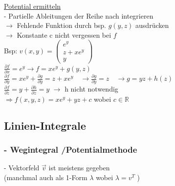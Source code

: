 \documentclass[6pt]{article}
\begin{document}
\begin{multicols*}{3}
	\underline{Potential ermitteln} \vspace{1mm}\\
	- Partielle Ableitungen der Reihe nach integrieren \\
	$\rightarrow$ Fehlende Funktion durch bsp. $g(y,z)$ ausdr{\"u}cken \\
	$\rightarrow$ Konstante c nicht vergessen bei $f$ \vspace{2mm}\\
	
	Bsp:	\quad $v(x,y) = \begin{pmatrix} e^y \\ z + xe^y \\y\end{pmatrix}$ \\
	
	$\frac{\partial f}{\partial x} =e^y \rightarrow f = xe^y + g(y,z)$ \vspace{1mm}\\
	$\frac{\partial f}{\partial y} = xe^y + \frac{\partial g}{\partial y}= z + xe^y  \quad\rightarrow  \frac{\partial g}{\partial y} = z \quad\rightarrow  g = yz + h(z)$ \vspace{1mm}\\
	$\frac{\partial f}{\partial z}  = y + \frac{\partial h}{\partial z} = y  $ \hspace{1mm} \qquad \qquad $\rightarrow $ h nicht notwendig \vspace{2mm}\\
	
	$\Rightarrow f(x,y,z) = xe^y + yz + c$ \quad wobei $c \in \mathbb{R} $

	\columnbreak
	\subsection*{Linien-Integrale}
	
	\subsubsection*{- Wegintegral /Potentialmethode}
	
		- Vektorfeld $\vec{v}$ ist meistens gegeben \\
		(manchmal auch als 1-Form $\lambda$  wobei $\lambda = v^T$ )
		

\end{multicols*}
\end{document}
